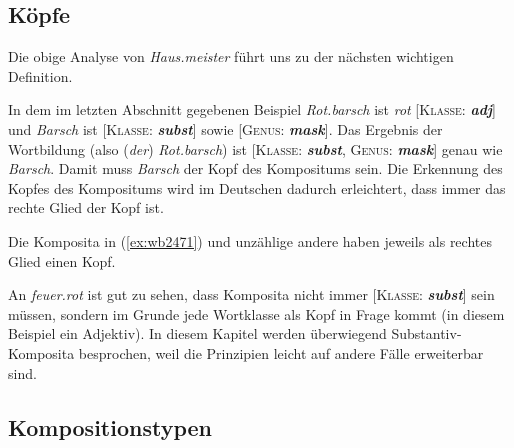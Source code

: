 \subsection{Köpfe}

\label{sec:wbkopf}

Die obige Analyse von \textit{Haus.meister} führt uns zu der nächsten wichtigen Definition.


In dem im letzten Abschnitt gegebenen Beispiel \textit{Rot.barsch} ist \textit{rot} [\textsc{Klasse}: \textit{\textbf{adj}}] und \textit{Barsch} ist [\textsc{Klasse}: \textit{\textbf{subst}}] sowie [\textsc{Genus}: \textit{\textbf{mask}}].
Das Ergebnis der Wortbildung (also (\textit{der}) \textit{Rot.barsch}) ist [\textsc{Klasse}: \textit{\textbf{subst}}, \textsc{Genus}: \textit{\textbf{mask}}] genau wie \textit{Barsch}.
Damit muss \textit{Barsch} der Kopf des Kompositums sein.
Die Erkennung des Kopfes des Kompositums wird im Deutschen dadurch erleichtert, dass immer das rechte Glied der Kopf ist.

Die Komposita in (\ref{ex:wb2471}) und unzählige andere haben jeweils als rechtes Glied einen Kopf.

\begin{exe}
  \ex\label{ex:wb2471}
  \begin{xlist}
  \end{xlist}
\end{exe}

An \textit{feuer.rot} ist gut zu sehen, dass Komposita nicht immer [\textsc{Klasse}: \textit{\textbf{subst}}] sein müssen, sondern im Grunde jede Wortklasse als Kopf in Frage kommt (in diesem Beispiel ein Adjektiv).
In diesem Kapitel werden überwiegend Substantiv-Komposita besprochen, weil die Prinzipien leicht auf andere Fälle erweiterbar sind.

\subsection{Kompositionstypen}

\label{sec:detrekkomp}

